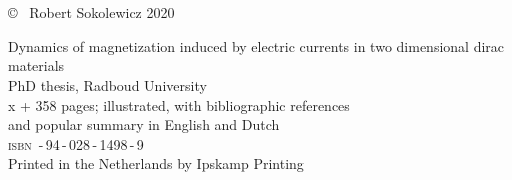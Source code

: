\frenchspacing
\raggedbottom

\thispagestyle{empty}
\vspace*{4em}
\begin{center}
\huge{}\\
\huge{}\\
\end{center}
\newpage

\thispagestyle{empty}
\null
\vfill

\setlength{\marginparwidth}{2em}
\setlength{\marginparsep}{0.75em}

\noindent \copyright~ Robert Sokolewicz 2020


\noindent Dynamics of magnetization induced by electric currents in two dimensional dirac materials\\
PhD thesis, Radboud University\\
x + 358 pages; illustrated, with bibliographic references \\ and popular summary in English and Dutch\\[2ex]
{\scshape isbn} \,-\,94\,-\,028\,-\,1498\,-\,9\\[2ex]
Printed in the Netherlands by Ipskamp Printing\\[2ex]


